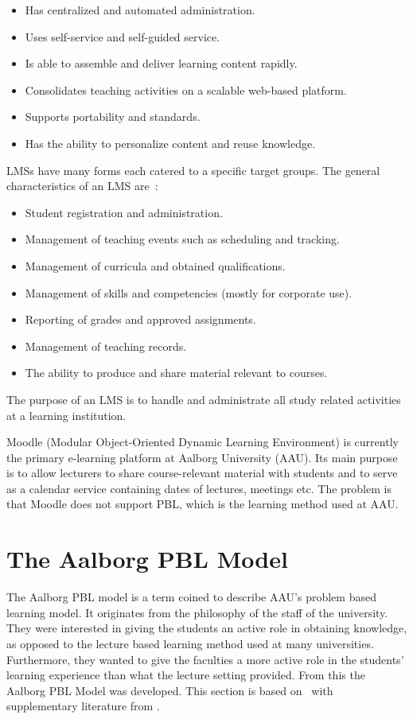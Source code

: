 \begin{itemize}
	\item Has centralized and automated administration.
	\item Uses self-service and self-guided service.
	\item Is able to assemble and deliver learning content rapidly.
	\item Consolidates teaching activities on a scalable web-based platform.
	\item Supports portability and standards.
	\item Has the ability to personalize content and reuse knowledge.
\end{itemize}

LMSs have many forms each catered to a specific target groups.
The general characteristics of an LMS are~\citep{Kerschenbaum}:

\begin{itemize}
	\item Student registration and administration.
	\item Management of teaching events such as scheduling and tracking.
	\item Management of curricula and obtained qualifications.
	\item Management of skills and competencies (mostly for corporate use).
	\item Reporting of grades and approved assignments.
	\item Management of teaching records.
	\item The ability to produce and share material relevant to courses.
\end{itemize}

The purpose of an LMS is to handle and administrate all study related activities at a learning institution.

Moodle (Modular Object-Oriented Dynamic Learning Environment) \citep{moodle} is currently the primary e-learning platform at Aalborg University (AAU). 
Its main purpose is to allow lecturers to share course-relevant material with students and to serve as a calendar service containing dates of lectures, meetings etc. 
The problem is that Moodle does not support PBL, which is the learning method used at AAU.

\section{The Aalborg PBL Model}
\label{sub:aaupbl}
The Aalborg PBL model is a term coined to describe AAU's problem based learning model. 
It originates from the philosophy of the staff of the university. 
They were interested in giving the students an active role in obtaining knowledge, as opposed to the lecture based learning method used at many universities.
Furthermore, they wanted to give the faculties a more active role in the students' learning experience than what the lecture setting provided. 
From this the Aalborg PBL Model was developed. 
This section is based on~\citep{Barge10} with supplementary literature from \cite[pp.~9-16]{theaalborgpblmodel2004}.

